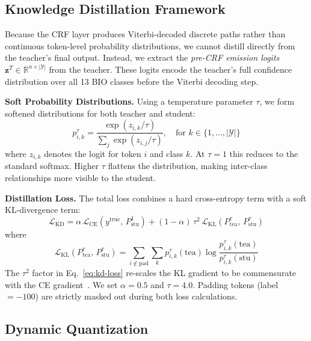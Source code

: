 \documentclass[conference]{IEEEtran}
\begin{document}
\subsection{Knowledge Distillation Framework}

Because the CRF layer produces Viterbi-decoded discrete paths rather than continuous token-level probability distributions, we cannot distill directly from the teacher's final output. Instead, we extract the \emph{pre-CRF emission logits} $\mathbf{z}^{T} \in \mathbb{R}^{n \times |\mathcal{Y}|}$ from the teacher. These logits encode the teacher's full confidence distribution over all 13 BIO classes before the Viterbi decoding step.

\textbf{Soft Probability Distributions.} Using a temperature parameter $\tau$, we form softened distributions for both teacher and student:
%
\begin{equation}
  p^{\tau}_{i,k} = \frac{\exp(z_{i,k} / \tau)}{\sum_{j} \exp(z_{i,j} / \tau)},
  \quad \text{for } k \in \{1, \ldots, |\mathcal{Y}|\}
  \label{eq:soft-prob}
\end{equation}
%
where $z_{i,k}$ denotes the logit for token $i$ and class $k$. At $\tau = 1$ this reduces to the standard softmax. Higher $\tau$ flattens the distribution, making inter-class relationships more visible to the student.

\textbf{Distillation Loss.} The total loss combines a hard cross-entropy term with a soft KL-divergence term:
%
\begin{equation}
  \mathcal{L}_{\mathrm{KD}} = \alpha \,\mathcal{L}_{\mathrm{CE}}\!\left(y^{\mathrm{true}},\, P^{1}_{\mathrm{stu}}\right)
  + (1 - \alpha)\,\tau^{2}\,\mathcal{L}_{\mathrm{KL}}\!\left(P^{\tau}_{\mathrm{tea}},\, P^{\tau}_{\mathrm{stu}}\right)
  \label{eq:kd-loss}
\end{equation}
%
where
%
\begin{equation}
  \mathcal{L}_{\mathrm{KL}}\!\left(P^{\tau}_{\mathrm{tea}},\, P^{\tau}_{\mathrm{stu}}\right)
  = \sum_{i \notin \mathrm{pad}} \sum_{k} p^{\tau}_{i,k}(\mathrm{tea})
    \log \frac{p^{\tau}_{i,k}(\mathrm{tea})}{p^{\tau}_{i,k}(\mathrm{stu})}
  \label{eq:kl}
\end{equation}
%
The $\tau^2$ factor in Eq.~\eqref{eq:kd-loss} re-scales the KL gradient to be commensurate with the CE gradient~\cite{b13}. We set $\alpha = 0.5$ and $\tau = 4.0$. Padding tokens (label $= -100$) are strictly masked out during both loss calculations.

\subsection{Dynamic Quantization}
\end{document}
